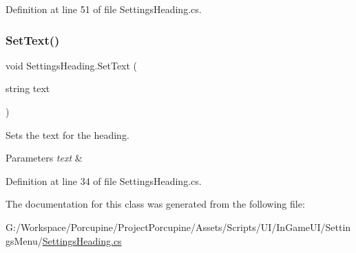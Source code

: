 Definition at line 51 of file Settings\+Heading.\+cs.

\mbox{\label{class_settings_heading_aaba3e6d88ae10b0f6b2cd4191283a01e}} 
\subsubsection{\texorpdfstring{Set\+Text()}{SetText()}}
{\footnotesize\ttfamily void Settings\+Heading.\+Set\+Text (\begin{DoxyParamCaption}\item[{string}]{text }\end{DoxyParamCaption})}



Sets the text for the heading. 


\begin{DoxyParams}{Parameters}
{\em text} & \\
\hline
\end{DoxyParams}


Definition at line 34 of file Settings\+Heading.\+cs.



The documentation for this class was generated from the following file\+:\begin{DoxyCompactItemize}
\item 
G\+:/\+Workspace/\+Porcupine/\+Project\+Porcupine/\+Assets/\+Scripts/\+U\+I/\+In\+Game\+U\+I/\+Settings\+Menu/\hyperlink{_settings_heading_8cs}{Settings\+Heading.\+cs}\end{DoxyCompactItemize}
